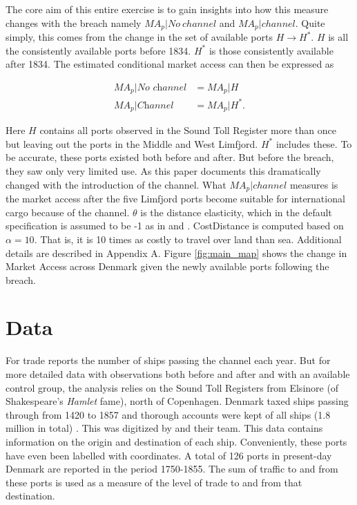 \documentclass[11pt]{article}
\begin{document}
The core aim of this entire exercise is to gain insights into how this measure changes with the breach namely ${MA}_p|No\:channel$ and ${MA}_p|channel$. Quite simply, this comes from the change in the set of available ports $H\rightarrow H^*$. $H$ is all the consistently available ports before 1834. $H^*$ is those consistently available after 1834. The estimated conditional market access can then be expressed as

\begin{equation}
\label{eq:MA3}
\begin{split}
{MA}_{p}|\textit{No channel} &= {MA}_{p}|H \\
{MA}_{p}|\textit{Channel} &= {MA}_{p}|H^*.
\end{split}
\end{equation}

Here $H$ contains all ports observed in the Sound Toll Register more than once but leaving out the ports in the Middle and West Limfjord. $H^*$ includes these. To be accurate, these ports existed both before and after. But before the breach, they saw only very limited use. As this paper documents this dramatically changed with the introduction of the channel. What ${MA}_{p}|channel$ measures is the market access after the five Limfjord ports become suitable for international cargo because of the channel. $\theta$ is the distance elasticity, which in the default specification is assumed to be -1 as in \cite{Harris1954} and \cite{rauch2022a}. CostDistance is computed based on $\alpha = 10$. That is, it is 10 times as costly to travel over land than sea. Additional details are described in Appendix A. Figure \ref{fig:main_map} shows the change in Market Access across Denmark given the newly available ports following the breach.

\FloatBarrier
\section{Data}
For trade \cite{Svalgaard1977} reports the number of ships passing the channel each year. But for more detailed data with observations both before and after and with an available control group, the analysis relies on the Sound Toll Registers from Elsinore (of Shakespeare's \textit{Hamlet} fame), north of Copenhagen. Denmark taxed ships passing through from 1420 to 1857 and thorough accounts were kept of all ships (1.8 million in total) \citep{gobel2010oresundstolden}. This was digitized by \cite{soundtoll_data} and their team. This data contains information on the origin and destination of each ship. Conveniently, these ports have even been labelled with coordinates. A total of 126 ports in present-day Denmark are reported in the period 1750-1855. The sum of traffic to and from these ports is used as a measure of the level of trade to and from that destination. 
\end{document}
